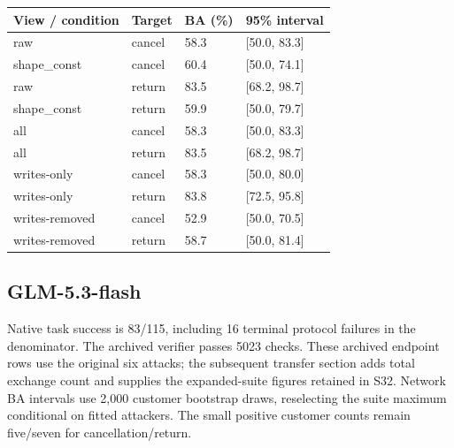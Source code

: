 \begin{center}\begin{tabular}{llll}\toprule

View / condition & Target & BA (\%) & 95\% interval\\\midrule

raw & cancel & 58.3 & [50.0, 83.3]\\

shape\_const & cancel & 60.4 & [50.0, 74.1]\\

raw & return & 83.5 & [68.2, 98.7]\\

shape\_const & return & 59.9 & [50.0, 79.7]\\

all & cancel & 58.3 & [50.0, 83.3]\\

all & return & 83.5 & [68.2, 98.7]\\

writes-only & cancel & 58.3 & [50.0, 80.0]\\

writes-only & return & 83.8 & [72.5, 95.8]\\

writes-removed & cancel & 52.9 & [50.0, 70.5]\\

writes-removed & return & 58.7 & [50.0, 81.4]\\

\bottomrule\end{tabular}\end{center}

\subsection{GLM-5.3-flash}

Native task success is 83/115, including 16 terminal protocol failures in the denominator. The archived verifier passes 5023 checks. These archived endpoint rows use the original six attacks; the subsequent transfer section adds total exchange count and supplies the expanded-suite figures retained in S32. Network BA intervals use 2,000 customer bootstrap draws, reselecting the suite maximum conditional on fitted attackers. The small positive customer counts remain five/seven for cancellation/return.

